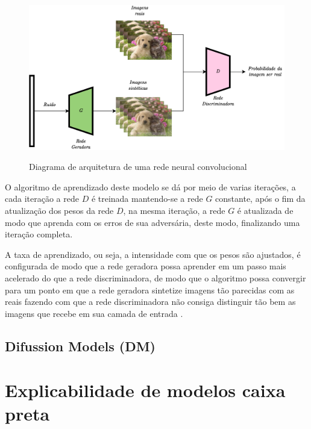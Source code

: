 \begin{figure}[htbp]
	\centering
	\caption{Diagrama de arquitetura de uma rede neural convolucional}
		\includegraphics[scale=.25]{imagens/gan.png}
	\label{fig:gan}
\end{figure}

O algoritmo de aprendizado deste modelo se dá por meio de varias iterações, a cada iteração a rede $D$ é treinada mantendo-se a rede $G$ constante, após o fim da atualização dos pesos da rede $D$, na mesma iteração, a rede $G$ é atualizada de modo que aprenda com os erros de sua adversária, deste modo, finalizando uma iteração completa.

A taxa de aprendizado, ou seja, a intensidade com que os pesos são ajustados, é configurada de modo que a rede geradora possa aprender em um passo mais acelerado do que a rede discriminadora, de modo que o algoritmo possa convergir para um ponto em que a rede geradora sintetize imagens tão parecidas com as reais fazendo com que a rede discriminadora não consiga distinguir tão bem as imagens que recebe em sua camada de entrada \cite{goodfellowGenerativeAdversarialNetworks2014}.



\subsection{Difussion Models (DM)}

\section{Explicabilidade de modelos caixa preta}